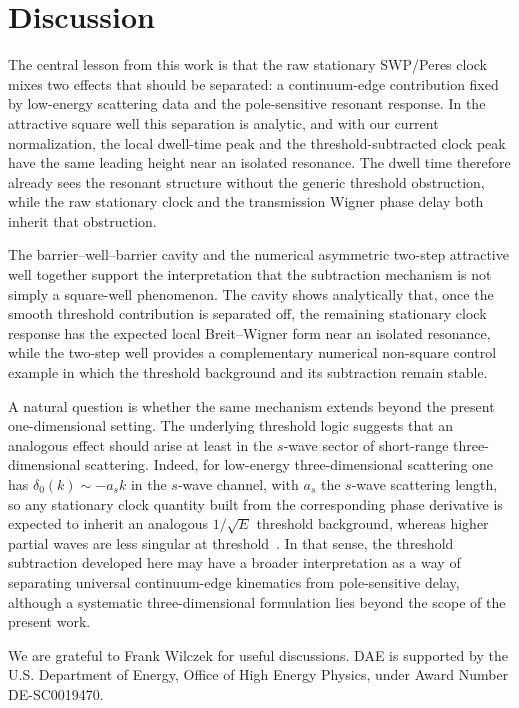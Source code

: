 \documentclass[aps,pra,preprint,notitlepage,nofootinbib]{revtex4-2}
\begin{document}
\FloatBarrier

\section{Discussion}
\label{sec:discussion}

The central lesson from this work is that the raw stationary SWP/Peres clock mixes two effects that should be separated: a continuum-edge contribution fixed by low-energy scattering data and the pole-sensitive resonant response.  In the attractive square well this separation is analytic, and with our current normalization, the local dwell-time peak and the threshold-subtracted clock peak have the same leading height near an isolated resonance. The dwell time therefore already sees the resonant structure without the generic threshold obstruction, while the raw stationary clock and the transmission Wigner phase delay both inherit that obstruction. 

The barrier--well--barrier cavity and the numerical asymmetric two-step attractive well together support the interpretation that the subtraction mechanism is not simply a square-well phenomenon. The cavity shows analytically that, once the smooth threshold contribution is separated off, the remaining stationary clock response has the expected local Breit--Wigner form near an isolated resonance, while the two-step well provides a complementary numerical non-square control example in which the threshold background and its subtraction remain stable.

A natural question is whether the same mechanism extends beyond the present one-dimensional setting. The underlying threshold logic suggests that an analogous effect should arise at least in the $s$-wave sector of short-range three-dimensional scattering. Indeed, for low-energy three-dimensional scattering one has $\delta_0(k)\sim -a_s k$ in the $s$-wave channel, with $a_s$ the $s$-wave scattering length, so any stationary clock quantity built from the corresponding phase derivative is expected to inherit an analogous $1/\sqrt{E}$ threshold background, whereas higher partial waves are less singular at threshold~\cite{Wigner1955,Kelkar2007}. In that sense, the threshold subtraction developed here may have a broader interpretation as a way of separating universal continuum-edge kinematics from pole-sensitive delay, although a systematic three-dimensional formulation lies beyond the scope of the present work.

\acknowledgments
We are grateful to Frank Wilczek for useful discussions. DAE is supported by the U.S. Department of Energy,
Office of High Energy Physics, under Award Number DE-SC0019470.
\end{document}

